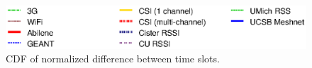\begin{figure}[h!]
  \centering
  \includegraphics[width=1\columnwidth]{fig/legend_temporal.eps}
  \caption{CDF of normalized difference between time slots.}
  \label{fig:temporal-stability}
\end{figure}


